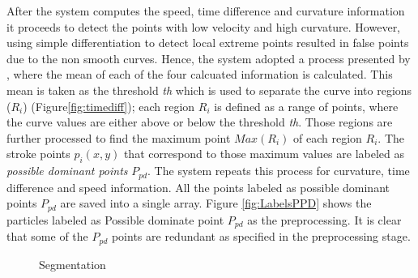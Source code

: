 \documentclass{article}
\begin{document}
After the system computes the speed, time difference and curvature information it proceeds to detect the points with low velocity and high curvature. However, using simple differentiation to detect local extreme points resulted in false points due to the non smooth curves. Hence, the system adopted a process presented by \cite{earlyprocess}, where the mean of each of the four calcuated information  is calculated. This mean is taken as the threshold \textit{th} which is used to separate the curve into regions ($R_i$) (Figure\ref{fig:timediff}); each region $R_i$ is defined as a range of points, where the curve values are either above or below the threshold \textit{th}. Those regions are further processed to find the maximum point $Max(R_i)$ of each region $R_i$. The stroke points $p_i(x,y)$ that correspond to those maximum values are labeled as \textit{possible dominant points} $P_{pd}$. The system repeats this process for curvature, time difference and speed information. All the points labeled as possible dominant points $P_{pd}$ are saved into a single array. Figure \ref{fig:LabelsPPD} shows the particles labeled as Possible dominate point $P_{pd}$ as the preprocessing. It is clear that some of the $P_{pd}$ points are redundant as specified in the preprocessing stage. %
\begin{figure}
	\centering
		\hfill
	\caption{Segmentation}%
	\label{fig:pso1}
\end{figure}
\end{document}
